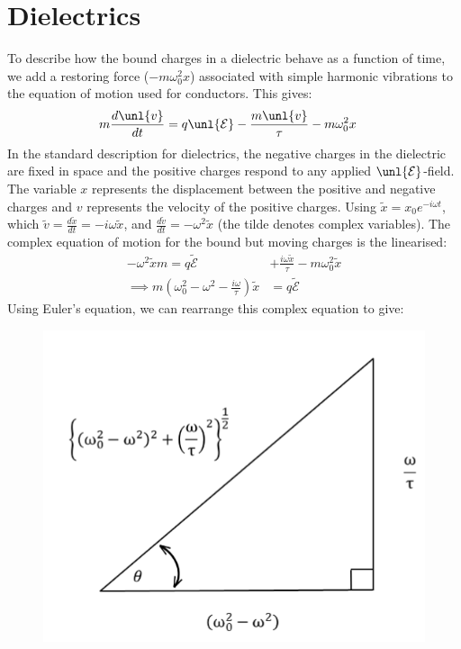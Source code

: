 \documentclass[a4paper, 11pt, normalem]{report}
\newcommand\E{\mathcal{E}}
\newcommand\uE{\unl{\E}}
\newcommand\om{\omega}
\newcommand\tx{\tilde{x}}
\newcommand\tv{\tilde{v}}
\begin{document}
\section{Dielectrics}
To describe how the bound charges in a dielectric behave as a function of time, we add a restoring force ($-m\om_0^2x$) associated with simple harmonic vibrations to the equation of motion  used for conductors.
This gives:
\begin{align}
	m\frac{d\unl{v}}{dt} &= q\uE - \frac{m\unl{v}}{\tau} - m\om_0^2x
\end{align}
In the standard description for dielectrics, the negative charges in the dielectric are fixed in space and the positive charges respond to any applied $\uE$-field.
The variable $x$ represents the displacement between the positive and negative charges and $v$ represents the velocity of the positive charges.
Using $\tx = x_0e^{-i\om t}$, which $\tv = \frac{d\tx}{dt} = -i\om \tx$, and $\frac{d\tv}{dt} = -\om^2\tx$ (the tilde denotes complex variables).
The complex equation of motion for the bound but moving charges is the linearised:
\begin{align}
	-\om^2\tx m = q\tilde{\E} &+ \frac{i\om\tx}{\tau} - m\om_0^2\tx \\
	\implies m\left(\om_0^2 - \om^2 - \frac{i\om}{\tau}\right)\tx &= q\tilde{\E}
\end{align}
Using Euler's equation, we can rearrange this complex equation to give:
\begin{figure}[H]
	\centering
	\includegraphics[scale=0.4]{pyth.png}
\end{figure}
\end{document}

